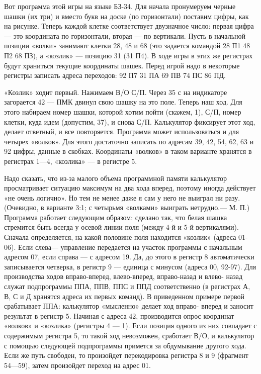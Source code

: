 \documentclass[11pt,a4paper,oneside]{article}
\begin{document}
Вот программа этой игры на языке БЗ-34. Для начала пронумеруем черные шашки (их три) и вместо букв на доске (по горизонтали) поставим цифры, как на рисунке. Теперь каждой клетке соответствует двузначное число: первая цифра — это координата по горизонтали, вторая — по вертикали. Пусть в начальной позиции «волки» занимают клетки 28, 48 и 68 (это задается командой 28 П1 48 П2 68 ПЗ), а «козлик» — позицию 31 (31 П4). В ходе игры в этих же регистрах будут храниться текущие координаты шашек. Перед игрой надо в некоторые регистры записать адреса переходов: 92 П7 31 ПА 69 ПВ 74 ПС 86 ПД.

«Козлик» ходит первый. Нажимаем В/О С/П. Через 35 с на индикаторе загорается 42 — ПМК двинул свою шашку на это поле. Теперь наш ход. Для этого набираем номер шашки, которой хотим пойти (скажем, 1), С/П, номер клетки, куда идем (допустим, 37), и снова С/П. Калькулятор фиксирует этот ход, делает ответный, и все повторяется. Программа может использоваться и для четырех «волков». Для этого достаточно записать по адресам 39, 42, 54, 62, 63 и 92 цифры, данные в скобках. Координаты «волков» в таком варианте хранятся в регистрах 1—4, «козлика» — в регистре 5.

Надо сказать, что из-за малого объема программной памяти калькулятор просматривает ситуацию максимум на два хода вперед, поэтому иногда действует «не очень логично». Но тем не менее даже я сам у него не выиграл ни разу. (Очевидно, в варианте 3:1; с четырьмя «волками» выиграть нетрудно.— М. П.) Программа работает следующим образом: сделано так, что белая шашка стремится быть всегда у осевой линии поля (между 4-й и 5-й вертикалями). Сначала определяется, на какой половине поля находится «козлик» (адреса 01-06). Если слева— управление передается на участок программы с начальным адресом 07, если справа — с адресом 19. Да, до этого в регистр 8 автоматически записывается четверка, в регистр 9 — единица с минусом (адреса 00, 92-97). Для производства ходов вправо-вперед, влево-вперед, вправо-назад и влево- назад служат подпрограммы ППА, ППВ, ППС и ППД соответственно (в регистрах А, В, С и Д хранятся адреса их первых команд). В приведенном примере первой срабатывает ППА: калькулятор «мысленно» делает ход вправо- вперед и заносит результат в регистр 5. Начиная с адреса 42, производится опрос координат «волков» и «козлика» (регистры 4 — 1). Если позиция одного из них совпадает с содержимым регистра 5, то такой ход невозможен, сработает В/О, и калькулятор с помощью следующей подпрограммы примется за обдумывание другого хода. Если же путь свободен, то произойдет перекодировка регистра 8 и 9 (фрагмент 54—59), затем произойдет переход на адрес 01.
\end{document}
